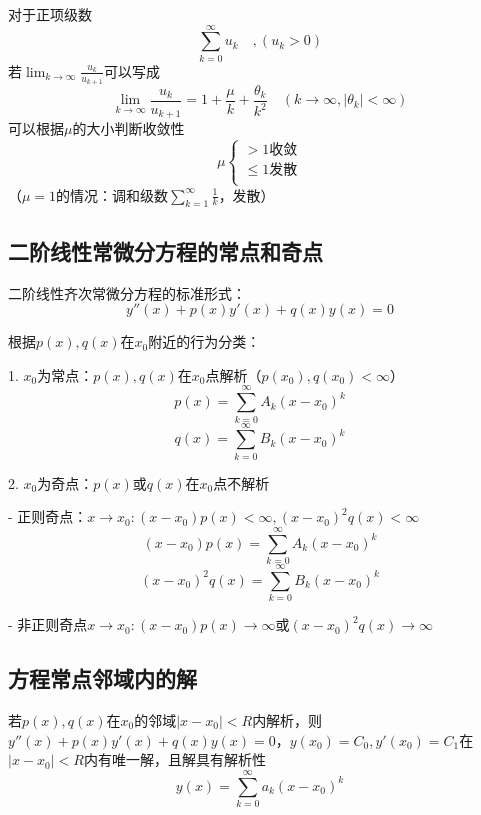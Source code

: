 \begin{thm}[高斯判别法]\label{Gauss}
对于正项级数
$$\sum_{k=0}^\infty u_k\quad ,(u_k>0)$$
若$\lim_{k\rightarrow\infty}\frac{u_{k}}{u_{k+1}}$可以写成
$$\lim_{k\rightarrow\infty}\frac{u_{k}}{u_{k+1}}=1+\frac{\mu}{k}+\frac{\theta_k}{k^2}\quad(k\rightarrow\infty,|\theta_k|<\infty)$$
可以根据$\mu$的大小判断收敛性
$$\mu\begin{cases}
>1 \mbox{收敛}\\
\le1 \mbox{发散}\\
\end{cases}$$
（$\mu=1$的情况：调和级数$\sum_{k=1}^{\infty}\frac{1}{k}$，发散）
\end{thm}

\subsection{二阶线性常微分方程的常点和奇点}
二阶线性齐次常微分方程的标准形式：
$$y''(x)+p(x)y'(x)+q(x)y(x)=0$$

根据$p(x),q(x)$在$x_0$附近的行为分类：

1. $x_0$为常点：$p(x),q(x)$在$x_0$点解析（$p(x_0),q(x_0)<\infty$）
  $$p(x)=\sum_{k=0}^\infty A_k(x-x_0)^k$$
  $$q(x)=\sum_{k=0}^\infty B_k(x-x_0)^k$$

2. $x_0$为奇点：$p(x)$或$q(x)$在$x_0$点不解析

- 正则奇点：$x\rightarrow x_0: (x-x_0)p(x)<\infty,(x-x_0)^2q(x)<\infty$
  $$(x-x_0)p(x)=\sum_{k=0}^\infty A_k(x-x_0)^k$$
  $$(x-x_0)^2q(x)=\sum_{k=0}^\infty B_k(x-x_0)^k$$

- 非正则奇点$x\rightarrow x_0: (x-x_0)p(x)\rightarrow\infty$或$(x-x_0)^2q(x)\rightarrow\infty$


\subsection{方程常点邻域内的解}
\begin{thm}\label{ordinary}
    若$p(x),q(x)$在$x_0$的邻域$|x-x_0|<R$内解析，则$y''(x)+p(x)y'(x)+q(x)y(x)=0$，$y(x_0)=C_0,y'(x_0)=C_1$在$|x-x_0|<R$内有唯一解，且解具有解析性
    $$y(x)=\sum_{k=0}^\infty a_k(x-x_0)^k$$
\end{thm}



